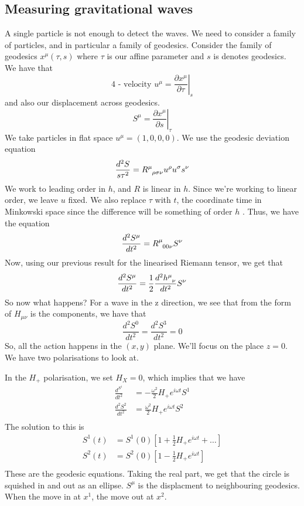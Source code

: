 \subsection{Measuring gravitational waves} 
A single particle is not enough to detect the waves. 
We need to consider a family of particles, and 
in particular a family of geodesics. 
Consider the family of geodesics $ x ^ \mu \left( \tau , s  \right)  $
 where $ \tau $ is our affine parameter and $ s $ is 
 denotes geodesics. 
 We have that 
 \[
  \text{4 - velocity } u ^ \mu = \left. \frac{\partial  x ^ \mu}{\partial  \tau }  \right\vert_{ s } 
 \] and also our displacement across geodesics. 
 \[
  S ^ \mu  = \left. \frac{\partial  x ^ \mu }{\partial  s }  \right\vert_{ \tau } 
  \] We take particles in flat space $ u ^ \mu  = ( 1, 0 , 0 , 0) $. 
  We use the geodesic deviation equation
  \[
   \frac{d ^ 2 S }{ s \tau ^ 2  } = R \indices{ ^ \mu _{ \rho \sigma \nu } } u ^ \rho u ^ \sigma s ^ \nu  
  \]  We work to leading order in $ h $, and $ R $ is linear in $ h $. 
  Since we're working to linear order, 
  we leave $ u $ fixed. We also replace $ \tau $ with $ t $, 
  the coordinate time in Minkowski space since 
  the difference will be something of order $ h $ . 
  Thus, we have the equation 
  \[
   \frac{ d ^2 S ^ \mu }{d t ^  2  } = R \indices{ ^ \mu _{ 0 0 \nu } } S ^ \nu  
  \] Now, using our previous result for the linearised Riemann tensor, 
  we get that 
  \[
   \frac{d ^ 2 S ^ \mu }{ d t ^ 2 } = \frac{1}{2 } \frac{d ^ 2 h \indices{ ^ \mu _ \nu }  }{ dt ^ 2 } S ^ \nu 
  \] So now what happens? For a wave in
  the z direction, we see that from the form of $ H_{ \mu \nu } $ 
  is the components, we have that 
  \[
   \frac{ d ^ 2 S ^ 0 }{ d t ^ 2 } = \frac{d ^ 2 S ^ 3 }{  dt ^ 2 }  =0 
  \] So, all the action happens in the $ \left(  x, y  \right)  $ plane. 
  We'll focus on the place $ z = 0 $. 
We have two polarisations to look at. 

In the $ H _ +  $ polarisation, we set $ H _ X = 0 $, 
which implies that we have 
\begin{align*}
	\frac{ d ^ S ^  1}{ dt ^ 2 } &=   - \frac{\omega ^  2 }{ 2 } H _ + e ^{ i \omega t } S ^ 1  \\ 
	\frac{ d ^ 2  S ^ 2  }{ d t ^  2 } &=  \frac{ \omega ^  2}{ 2 } H _ + e ^{ i \omega t }  S^  2 \\ 
\end{align*}
The solution to this is 
\begin{align*}
	S ^ 1 ( t ) & = S ^ 1 ( 0 ) \left[  1 + \frac{1}{2 } H _ + e ^{ i \omega t } + \dots  \right] \\
	S ^ 2 (t ) &=  S ^ 2 ( 0 ) \left[  1 - \frac{1}{2 } H _ + e ^{ i \omega t }  \right]   \\ 
\end{align*} 
These are the geodesic equations. Taking the real part, 
we get that the circle is squished in and out as an ellipse. 
$ S ^ \mu $ is the displacment to neighbouring geodesics. 
When the move in at $ x ^ 1 $, the move out at $ x ^ 2 $. 


